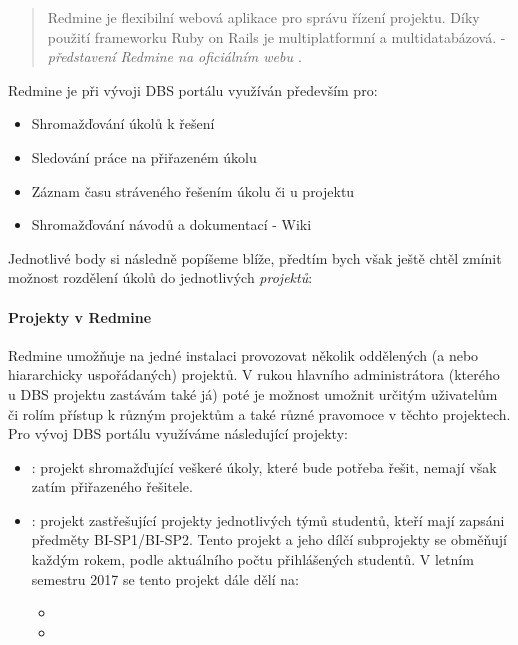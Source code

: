 \begin{quote}
Redmine je flexibilní webová aplikace pro správu řízení projektu. Díky použití frameworku Ruby on Rails je multiplatformní a multidatabázová. - \emph{představení Redmine na oficiálním webu \cite{redmine}}.
\end{quote}

Redmine je při vývoji DBS portálu využíván především pro:
\begin{itemize}
	\item Shromažďování úkolů k řešení
	\item Sledování práce na přiřazeném úkolu
	\item Záznam času stráveného řešením úkolu či u projektu
	\item Shromažďování návodů a dokumentací - Wiki
\end{itemize}
Jednotlivé body si následně popíšeme blíže, předtím bych však ještě chtěl zmínit možnost rozdělení úkolů do jednotlivých \emph{projektů}:

\paragraph{Projekty v Redmine}

Redmine umožňuje na jedné instalaci provozovat několik oddělených (a nebo hiararchicky uspořádaných) projektů. V rukou hlavního administrátora (kterého u DBS projektu zastávám také já) poté je možnost umožnit určitým uživatelům či rolím přístup k různým projektům a také různé pravomoce v těchto projektech.\\
Pro vývoj DBS portálu využíváme následující projekty:
\begin{itemize}
	\item {}: projekt shromažďující veškeré úkoly, které bude potřeba řešit, nemají však zatím přiřazeného řešitele.
	\item {}: projekt zastřešující projekty jednotlivých týmů studentů, kteří mají zapsáni předměty BI-SP1/BI-SP2. Tento projekt a jeho dílčí subprojekty se obměňují každým rokem, podle aktuálního počtu přihlášených studentů. V letním semestru 2017 se tento projekt dále dělí na:
	\begin{itemize}
		\item {}
		\item {}
	\end{itemize}
\end{itemize}

